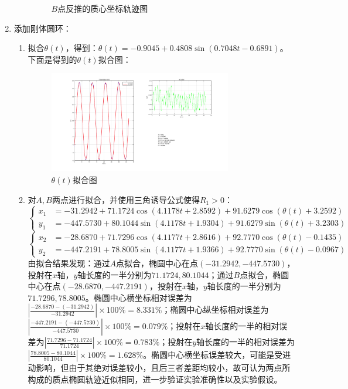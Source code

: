 \documentclass[11pt]{article}
\begin{document}
\begin{enumerate}
\begin{enumerate}
\begin{figure}[H]
\begin{minipage}[t]{0.48\textwidth}
                \vspace{-0.5cm}
                \caption{$B$点反推的质心坐标轨迹图}
            \end{minipage}
        \end{figure}
    \end{enumerate}
    \item 添加刚体圆环：
    \begin{enumerate}
        \item 拟合$\theta(t)$，得到：$\theta(t)=-0.9045+0.4808\sin(0.7048t-0.6891)$。下面是得到的$\theta(t)$拟合图：
        \begin{figure}[H]
            \centering
            \includegraphics[width=0.8\textwidth]{Figs/Ex2.theta.png}
            \vspace{-0.5cm}
            \caption{$\theta(t)$拟合图}
        \end{figure}
        \item 对$A,B$两点进行拟合，并使用三角诱导公式使得$R_1>0$：
        $$\left\{
        \begin{aligned}
            x_1&=-31.2942+71.1724\cos(4.1178t+2.8592)+91.6279\cos(\theta(t)+3.2592) \\
            y_1&=-447.5730+80.1044\sin(4.1178t+1.9304)+91.6279\sin(\theta(t)+3.2303)
        \end{aligned}
        \right.$$
        $$\left\{
        \begin{aligned}
            x_2&=-28.6870+71.7296\cos(4.1177t+2.8616)+92.7770\cos(\theta(t)-0.1435) \\
            y_2&=-447.2191+78.8005\sin(4.1177t+1.9366)+92.7770\sin(\theta(t)-0.0967)
        \end{aligned}
        \right.$$
        由拟合结果发现：通过$A$点拟合，椭圆中心在点$(-31.2942,-447.5730)$，投射在$x$轴，$y$轴长度的一半分别为$71.1724,80.1044$；通过$B$点拟合，椭圆中心在点$(-28.6870,-447.2191)$，投射在$x$轴，$y$轴长度的一半分别为$71.7296,78.8005$。椭圆中心横坐标相对误差为$\left|\frac{-28.6870-(-31.2942)}{-31.2942}\right|\times100\%=8.331\% $；椭圆中心纵坐标相对误差为$\left|\frac{-447.2191-(-447.5730)}{-447.5730}\right|\times100\%=0.079\%$；投射在$x$轴长度的一半的相对误差为$\left|\frac{71.7296-71.1724}{71.1724}\right|\times100\%=0.783\%$；投射在$y$轴长度的一半的相对误差为$\left|\frac{78.8005-80.1044}{80.1044}\right|\times100\%=1.628\%$。椭圆中心横坐标误差较大，可能是受进动影响，但由于其绝对误差较小，且后三者差距均较小，故可认为两点所构成的质点椭圆轨迹近似相同，进一步验证实验准确性以及实验假设。
        

\end{enumerate}
\end{enumerate}
\end{document}
